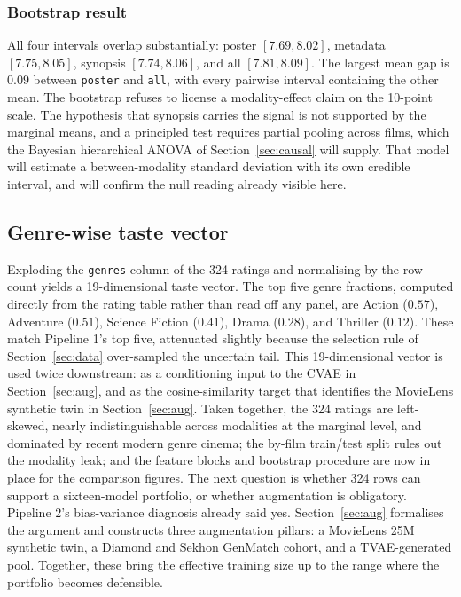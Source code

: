 \documentclass{article}
\begin{document}
\subsubsection*{Bootstrap result}

All four intervals overlap substantially: poster $[7.69, 8.02]$, metadata $[7.75, 8.05]$, synopsis $[7.74, 8.06]$, and all $[7.81, 8.09]$. The largest mean gap is $0.09$ between \texttt{poster} and \texttt{all}, with every pairwise interval containing the other mean. The bootstrap refuses to license a modality-effect claim on the 10-point scale. The hypothesis that synopsis carries the signal is not supported by the marginal means, and a principled test requires partial pooling across films, which the Bayesian hierarchical ANOVA of Section~\ref{sec:causal} will supply. That model will estimate a between-modality standard deviation with its own credible interval, and will confirm the null reading already visible here.

\subsection{Genre-wise taste vector}

Exploding the \texttt{genres} column of the 324 ratings and normalising by the row count yields a 19-dimensional taste vector. The top five genre fractions, computed directly from the rating table rather than read off any panel, are Action ($0.57$), Adventure ($0.51$), Science Fiction ($0.41$), Drama ($0.28$), and Thriller ($0.12$). These match Pipeline 1's top five, attenuated slightly because the selection rule of Section~\ref{sec:data} over-sampled the uncertain tail. This 19-dimensional vector is used twice downstream: as a conditioning input to the CVAE in Section~\ref{sec:aug}, and as the cosine-similarity target that identifies the MovieLens synthetic twin in Section~\ref{sec:aug}. Taken together, the 324 ratings are left-skewed, nearly indistinguishable across modalities at the marginal level, and dominated by recent modern genre cinema; the by-film train/test split rules out the modality leak; and the feature blocks and bootstrap procedure are now in place for the comparison figures. The next question is whether 324 rows can support a sixteen-model portfolio, or whether augmentation is obligatory. Pipeline 2's bias-variance diagnosis already said yes. Section~\ref{sec:aug} formalises the argument and constructs three augmentation pillars: a MovieLens 25M synthetic twin, a Diamond and Sekhon GenMatch cohort, and a TVAE-generated pool. Together, these bring the effective training size up to the range where the portfolio becomes defensible.
\end{document}
